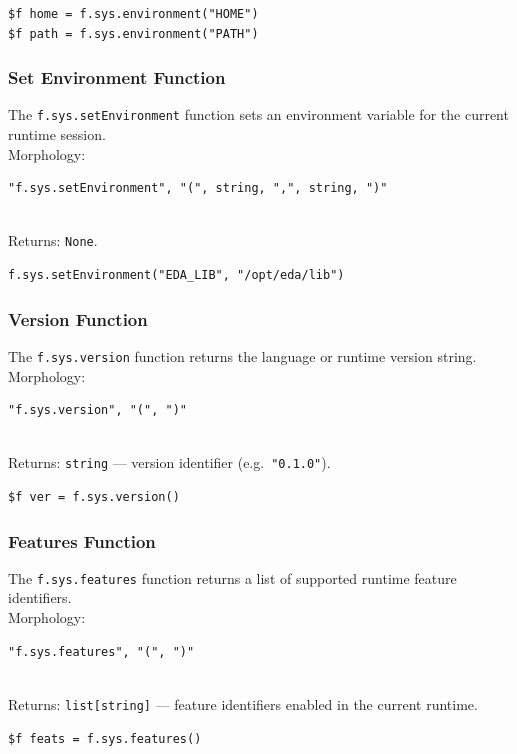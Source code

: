 \begin{verbatim}
$f home = f.sys.environment("HOME")
$f path = f.sys.environment("PATH")
\end{verbatim}

\subsubsection{Set Environment Function}
The \texttt{f.sys.setEnvironment} function sets an environment variable for the current runtime session.
\\ Morphology:
\begin{verbatim}
"f.sys.setEnvironment", "(", string, ",", string, ")"
\end{verbatim}
\\ Returns: \texttt{None}.

\begin{verbatim}
f.sys.setEnvironment("EDA_LIB", "/opt/eda/lib")
\end{verbatim}

\subsubsection{Version Function}
The \texttt{f.sys.version} function returns the language or runtime version string.
\\ Morphology:
\begin{verbatim}
"f.sys.version", "(", ")"
\end{verbatim}
\\ Returns: \texttt{string} --- version identifier (e.g.\ \texttt{"0.1.0"}).

\begin{verbatim}
$f ver = f.sys.version()
\end{verbatim}

\subsubsection{Features Function}
The \texttt{f.sys.features} function returns a list of supported runtime feature identifiers.
\\ Morphology:
\begin{verbatim}
"f.sys.features", "(", ")"
\end{verbatim}
\\ Returns: \texttt{list[string]} --- feature identifiers enabled in the current runtime.

\begin{verbatim}
$f feats = f.sys.features()
\end{verbatim}

